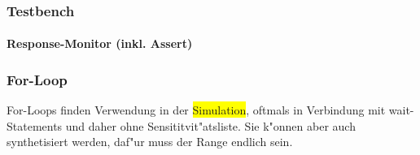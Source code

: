 \begin{multicols}{2}
	\subsubsection{Testbench}
	
\end{multicols}

%				
%					
%					
%					
\vspace{-\baselineskip}
\begin{minipage}{0.63\textwidth}
	\paragraph{Response-Monitor (inkl. Assert)}
		
\end{minipage}
\hfill
\begin{minipage}{0.35\textwidth}
	\subsubsection{For-Loop} %
	For-Loops finden Verwendung in der \colorbox{yellow}{Simulation}, oftmals in Verbindung mit wait-Statements und daher ohne Sensititvit"atsliste. Sie k"onnen aber auch synthetisiert werden, daf"ur muss der Range 
	endlich sein.
	
\end{minipage}
					
